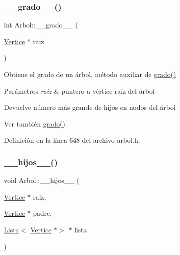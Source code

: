 \subsubsection{\texorpdfstring{\+\_\+\+\_\+grado\+\_\+\+\_\+()}{\_\_grado\_\_()}}
{\footnotesize\ttfamily int Arbol\+::\+\_\+\+\_\+grado\+\_\+\+\_\+ (\begin{DoxyParamCaption}\item[{\hyperlink{classVertice}{Vertice} $\ast$}]{raiz }\end{DoxyParamCaption})\hspace{0.3cm}{\ttfamily [protected]}}



Obtiene el grado de un árbol, método auxiliar de \hyperlink{classArbol_a99e608849650b891c34852a81f93d4ab}{grado()} 


\begin{DoxyParams}{Parámetros}
{\em raiz} & puntero a vértice raíz del árbol \\
\hline
\end{DoxyParams}
\begin{DoxyReturn}{Devuelve}
número más grande de hijos en nodos del árbol 
\end{DoxyReturn}
\begin{DoxySeeAlso}{Ver también}
\hyperlink{classArbol_a99e608849650b891c34852a81f93d4ab}{grado()} 
\end{DoxySeeAlso}


Definición en la línea 648 del archivo arbol.\+h.

\mbox{\label{classArbol_a1e3da012e6667062976bca9f78efef7e}} 
\subsubsection{\texorpdfstring{\+\_\+\+\_\+hijos\+\_\+\+\_\+()}{\_\_hijos\_\_()}}
{\footnotesize\ttfamily void Arbol\+::\+\_\+\+\_\+hijos\+\_\+\+\_\+ (\begin{DoxyParamCaption}\item[{\hyperlink{classVertice}{Vertice} $\ast$}]{raiz,  }\item[{\hyperlink{classVertice}{Vertice} $\ast$}]{padre,  }\item[{\hyperlink{classLista}{Lista}$<$ \hyperlink{classVertice}{Vertice} $\ast$$>$ $\ast$}]{lista }\end{DoxyParamCaption})\hspace{0.3cm}{\ttfamily [protected]}}



